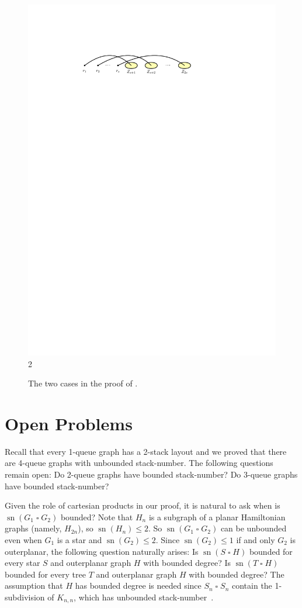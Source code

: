 \documentclass[kpfonts]{patmorin}
\DeclareMathOperator{\sn}{sn}
\renewcommand{\leq}{\leqslant}
\newcommand{\CartProd}{\mathbin{\square}}
\begin{document}
\begin{figure}
\begin{center}
		\includegraphics{figs/median-2} \\ 2
	\end{center}
	\caption{The two cases in the proof of .}
\end{figure}

\section{Open Problems}

Recall that every 1-queue graph has a 2-stack layout \citep{HLR92} and we proved that there are 4-queue graphs with unbounded stack-number. The following questions remain open: Do 2-queue graphs have bounded stack-number? Do 3-queue graphs have bounded stack-number?

Given the role of cartesian products in our proof, it is natural to ask when is $\sn(G_1\CartProd G_2)$ bounded? Note that $H_n$ is a subgraph of a planar Hamiltonian graphs (namely, $H_{2n}$), so $\sn(H_n) \leq 2$. So $\sn(G_1\CartProd G_2)$ can be unbounded even when $G_1$ is a star and $\sn(G_2)\leq 2$.
Since $\sn(G_2)\leq 1$ if and only $G_2$ is outerplanar, the following question naturally arises: Is $\sn(S \CartProd H)$ bounded for every star $S$ and outerplanar graph $H$ with bounded degree? Is $\sn(T \CartProd H)$ bounded for every tree $T$ and outerplanar graph $H$ with bounded degree? The assumption that $H$ has bounded degree is needed since $S_n \CartProd S_n$ contain the 1-subdivision of $K_{n,n}$, which has unbounded stack-number~\citep{Blankenship-PhD03}.
\end{document}
